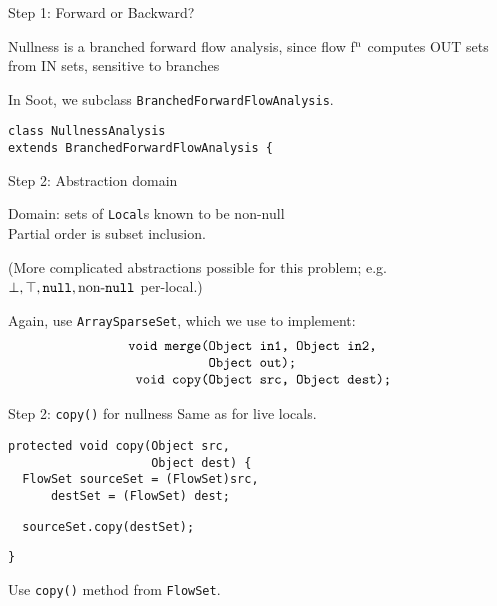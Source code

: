 \begin{slide}{Step 1: Forward or Backward?}

Nullness is a branched forward flow analysis, since flow
f$^{\mbox{\scriptsize n}}$ computes {\sf OUT} sets from {\sf IN} sets, 
sensitive to branches

\qquad

In Soot, we subclass {\tt \red BranchedForwardFlowAnalysis}.

\qquad

{\small \red \tt class NullnessAnalysis \\ 
           \qquad extends BranchedForwardFlowAnalysis \{ }
\end{slide}

\begin{slide}{Step 2: Abstraction domain}
\vspace*{-0.2in}

Domain: sets of {\tt Local}s known to be non-null\\
Partial order is subset inclusion.

\quad

(More complicated abstractions possible for this problem; e.g. 
$\perp, \top, \mbox{\tt null}, \mbox{non-{\tt null}}$ per-local.)

\quad

Again, use {\tt ArraySparseSet}, which we use to implement:
{\small 
\[ \mbox{\tt \begin{tabular}{r@{}l}
                 void merge(&Object in1, Object in2,\\
                            &Object out);\\
                 void copy(&Object src, Object dest);
\end{tabular}}\]
}
\end{slide}

\begin{slide}{Step 2: {\tt copy()} for nullness}
Same as for live locals.

\begin{verbatim}
protected void copy(Object src, 
                    Object dest) {
  FlowSet sourceSet = (FlowSet)src,
      destSet = (FlowSet) dest;

\end{verbatim}    
{\red\verb+  sourceSet.copy(destSet);+}
\begin{verbatim}
}
\end{verbatim}

\qquad

Use {\tt copy()} method from {\tt FlowSet}.
\end{slide}

